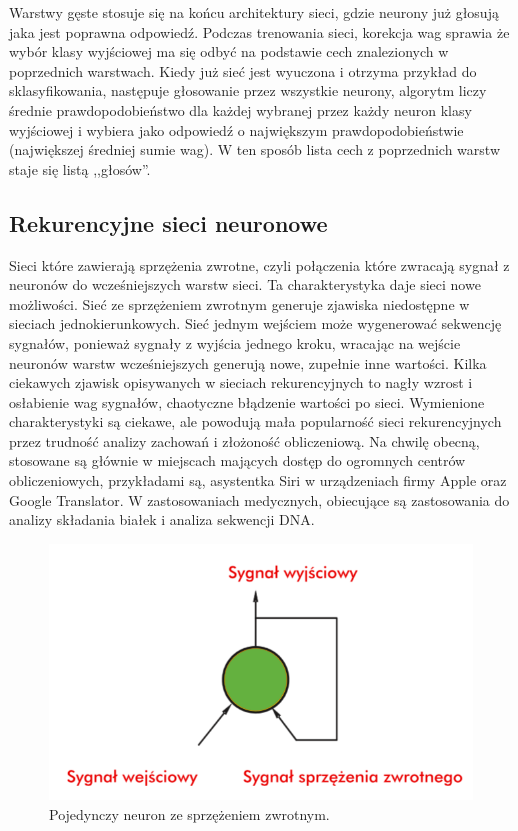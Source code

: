 \documentclass[12pt,a4paper,twoside,titlepage,openright]{book}
\begin{document}
Warstwy gęste stosuje się na końcu architektury sieci, gdzie neurony już głosują jaka jest poprawna odpowiedź. Podczas trenowania sieci, korekcja wag sprawia że wybór klasy wyjściowej ma się odbyć na podstawie cech znalezionych w poprzednich warstwach. Kiedy już sieć jest wyuczona i otrzyma przykład do sklasyfikowania, następuje głosowanie przez wszystkie neurony, algorytm liczy średnie prawdopodobieństwo dla każdej wybranej przez każdy neuron klasy wyjściowej i wybiera jako odpowiedź o największym prawdopodobieństwie (największej średniej sumie wag). W ten sposób lista cech z poprzednich warstw staje się listą ,,głosów''.

\subsection{Rekurencyjne sieci neuronowe}
Sieci które zawierają sprzężenia zwrotne, czyli połączenia które zwracają sygnał z neuronów do wcześniejszych warstw sieci. Ta charakterystyka daje sieci nowe możliwości. Sieć ze sprzężeniem zwrotnym generuje zjawiska niedostępne w sieciach jednokierunkowych. Sieć jednym wejściem może wygenerować sekwencję sygnałów, ponieważ sygnały z wyjścia jednego kroku, wracając na wejście neuronów warstw wcześniejszych generują nowe, zupełnie inne wartości. Kilka ciekawych zjawisk opisywanych w sieciach rekurencyjnych to nagły wzrost i osłabienie wag sygnałów, chaotyczne błądzenie wartości po sieci. Wymienione charakterystyki są ciekawe, ale powodują mała popularność sieci rekurencyjnych przez trudność analizy zachowań i złożoność obliczeniową. Na chwilę obecną, stosowane są głównie w miejscach mających dostęp do ogromnych centrów obliczeniowych, przykładami są, asystentka Siri w urządzeniach firmy Apple oraz Google Translator. W zastosowaniach medycznych, obiecujące są zastosowania do analizy składania białek i analiza sekwencji DNA.

\begin{figure}[ht]
	\centering
			\includegraphics[resolution=100, scale=0.5]{recurrentNeuralNetwork.png}
		\caption{Pojedynczy neuron ze sprzężeniem zwrotnym.}
\end{figure}
\end{document}
